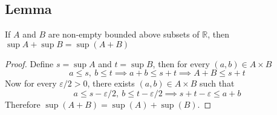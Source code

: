 \documentclass[../../main.tex]{subfiles}
\begin{document}
\subsection{Lemma}
\begin{lemma}\label{lemma:add_sup}
    If $A$ and $B$ are non-empty bounded above subsets of $\mathbb{R}$, then $\sup A +\sup B = \sup(A+B)$
\end{lemma}
\begin{proof}
    Define $s = \sup A$ and $t = \sup B$, then for every $(a,b)\in A\times B$
    \[
        a\leq s,\:b\leq t\implies a+b\leq s+t\implies A+B\leq s+t
    \]
    Now for every $\varepsilon/2>0$, there exists $(a,b)\in A\times B$ such that
    \[
    a\leq s-\varepsilon/2,\:b\leq t-\varepsilon/2\implies s+t-\varepsilon\leq a+b
    \]
    Therefore $\sup(A+B) = \sup(A) + \sup(B)$.
\end{proof}
\end{document}

